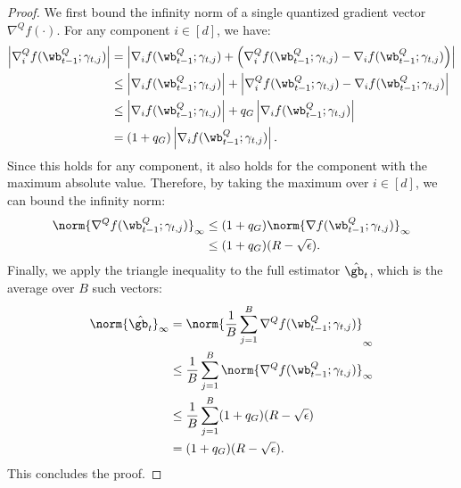 \documentclass[11pt, letterpaper]{article}
\begin{document}
\begin{proof}
We first bound the infinity norm of a single quantized gradient vector $\nabla^Q f(\cdot)$. For any component $i \in [d]$, we have:
\begin{align}
    \left| \nabla_i^Q f(\wb_{t-1}^Q; \gamma_{t,j}) \right| &= \left| \nabla_i f(\wb_{t-1}^Q; \gamma_{t,j}) + \left(\nabla_i^Q f(\wb_{t-1}^Q; \gamma_{t,j}) - \nabla_i f(\wb_{t-1}^Q; \gamma_{t,j})\right) \right| \nonumber \\
    &\le \left| \nabla_i f(\wb_{t-1}^Q; \gamma_{t,j}) \right| + \left| \nabla_i^Q f(\wb_{t-1}^Q; \gamma_{t,j}) - \nabla_i f(\wb_{t-1}^Q; \gamma_{t,j}) \right| \nonumber \\
    &\le \left| \nabla_i f(\wb_{t-1}^Q; \gamma_{t,j}) \right| + q_G \left| \nabla_i f(\wb_{t-1}^Q; \gamma_{t,j}) \right|  \nonumber \\
    &= (1+q_G) \left| \nabla_i f(\wb_{t-1}^Q; \gamma_{t,j}) \right|.
\end{align}
Since this holds for any component, it also holds for the component with the maximum absolute value. Therefore, by taking the maximum over $i \in [d]$, we can bound the infinity norm:
\begin{align}
    \norm{\nabla^Q f(\wb_{t-1}^Q; \gamma_{t,j})}_\infty &\le (1+q_G) \norm{\nabla f(\wb_{t-1}^Q; \gamma_{t,j})}_\infty \nonumber \\
    &\le (1+q_G) (R - \sqrt{\epsilon}).
\end{align}
Finally, we apply the triangle inequality to the full estimator $\hat{\gb_t}$, which is the average over $B$ such vectors:
\begin{align}
    \norm{\hat{\gb_t}}_\infty &= \norm{\frac{1}{B} \sum_{j=1}^{B} \nabla^Q f(\wb_{t-1}^Q; \gamma_{t,j})}_\infty \nonumber \\
    &\le \frac{1}{B} \sum_{j=1}^{B} \norm{\nabla^Q f(\wb_{t-1}^Q; \gamma_{t,j})}_\infty \nonumber \\
    &\le \frac{1}{B} \sum_{j=1}^{B} (1+q_G) (R - \sqrt{\epsilon}) \nonumber \\
    &= (1+q_G) (R - \sqrt{\epsilon}).
\end{align}
This concludes the proof.
\end{proof}
\end{document}

